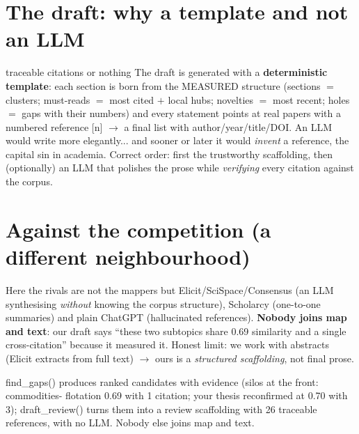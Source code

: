 \documentclass[11pt,a4paper]{article}
\begin{document}
\section{The draft: why a template and not an LLM}

\begin{concepto}{traceable citations or nothing}
The draft is generated with a \textbf{deterministic template}: each section is born from the
MEASURED structure (sections $=$ clusters; must-reads $=$ most cited $+$ local hubs; novelties
$=$ most recent; holes $=$ gaps with their numbers) and every statement points at real papers
with a numbered reference [n] $\rightarrow$ a final list with author/year/title/DOI. An LLM
would write more elegantly... and sooner or later it would \emph{invent} a reference, the
capital sin in academia. Correct order: first the trustworthy scaffolding, then (optionally) an
LLM that polishes the prose while \emph{verifying} every citation against the corpus.
\end{concepto}

\section{Against the competition (a different neighbourhood)}

Here the rivals are not the mappers but Elicit/SciSpace/Consensus (an LLM synthesising
\emph{without} knowing the corpus structure), Scholarcy (one-to-one summaries) and plain
ChatGPT (hallucinated references). \textbf{Nobody joins map and text}: our draft says ``these
two subtopics share 0.69 similarity and a single cross-citation'' because it measured it.
Honest limit: we work with abstracts (Elicit extracts from full text) $\rightarrow$ ours is a
\emph{structured scaffolding}, not final prose.

\begin{resumen}
find\_gaps() produces ranked candidates with evidence (silos at the front: commodities-
flotation 0.69 with 1 citation; your thesis reconfirmed at 0.70 with 3); draft\_review() turns
them into a review scaffolding with 26 traceable references, with no LLM. Nobody else joins
map and text.
\end{resumen}
\end{document}
